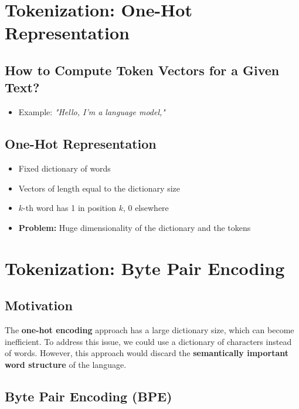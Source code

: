 \documentclass[11pt,a4paper]{article}
\theoremstyle{definition}
\theoremstyle{plain}
\theoremstyle{remark}
\begin{document}
\section{Tokenization: One-Hot Representation}

\subsection{How to Compute Token Vectors for a Given Text?}

\begin{itemize}
    \item Example: \textit{"Hello, I'm a language model,"}
\end{itemize}

\subsection{One-Hot Representation}

\begin{itemize}
    \item Fixed dictionary of words
    \item Vectors of length equal to the dictionary size
    \item $k$-th word has 1 in position $k$, 0 elsewhere
    \item \textbf{Problem:} Huge dimensionality of the dictionary and the tokens
\end{itemize}



\section{Tokenization: Byte Pair Encoding}

\subsection{Motivation}

\begin{tcolorbox}[colback=yellow!5!white,colframe=yellow!75!black,title=\textbf{One-Hot Encoding Issues}]
The \textbf{one-hot encoding} approach has a large dictionary size, which can become inefficient. To address this issue, we could use a dictionary of characters instead of words. However, this approach would discard the \textbf{semantically important word structure} of the language.
\end{tcolorbox}

\subsection{Byte Pair Encoding (BPE)}
\end{document}
